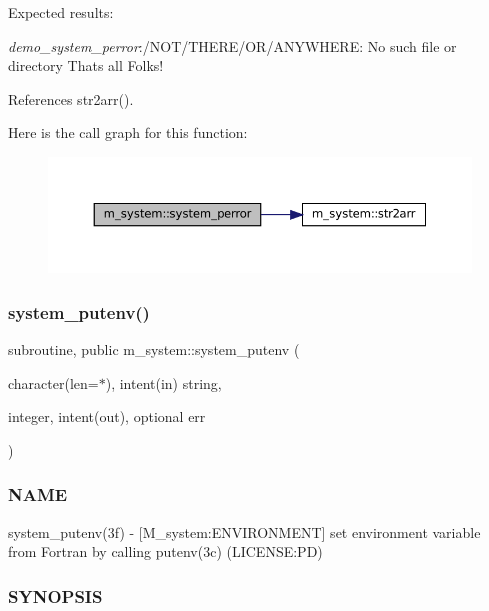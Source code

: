 Expected results\+:

{\itshape demo\+\_\+system\+\_\+perror}\+:/\+N\+O\+T/\+T\+H\+E\+R\+E/\+O\+R/\+A\+N\+Y\+W\+H\+E\+RE\+: No such file or directory That\textquotesingle{}s all Folks! 

References str2arr().

Here is the call graph for this function\+:
\nopagebreak
\begin{figure}[H]
\begin{center}
\leavevmode
\includegraphics[width=350pt]{namespacem__system_afae451a1fc5432274dc1f75a364051b4_cgraph}
\end{center}
\end{figure}
\mbox{\label{namespacem__system_af0c9df8e59cac9cd617cd1e20448ea7d}} 
\subsubsection{\texorpdfstring{system\+\_\+putenv()}{system\_putenv()}}
{\footnotesize\ttfamily subroutine, public m\+\_\+system\+::system\+\_\+putenv (\begin{DoxyParamCaption}\item[{character(len=$\ast$), intent(in)}]{string,  }\item[{integer, intent(out), optional}]{err }\end{DoxyParamCaption})}



\subsubsection*{N\+A\+ME}

system\+\_\+putenv(3f) -\/ \mbox{[}M\+\_\+system\+:E\+N\+V\+I\+R\+O\+N\+M\+E\+NT\mbox{]} set environment variable from Fortran by calling putenv(3c) (L\+I\+C\+E\+N\+SE\+:PD) 

\subsubsection*{S\+Y\+N\+O\+P\+S\+IS}

